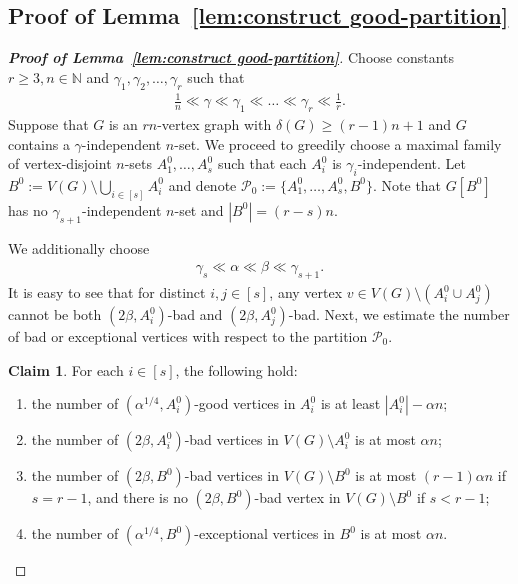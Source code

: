 \documentclass[11pt, a4paper]{article}
\theoremstyle{definition}
\newtheorem{claim}[theorem]{Claim}
\newcommand{\<}{\subseteq}
\begin{document}
\subsection{Proof of Lemma~\ref{lem:construct good-partition}}




\begin{proof}[{\bf Proof of Lemma~\ref{lem:construct good-partition}}]
Choose constants $r\geq 3,n\in \mathbb{N}$ and $\gamma_1,\gamma_2,\dots,\gamma_r$ such that 
\begin{align*}%
    \frac{1}{n}\ll \gamma \ll \gamma_1\ll \dots \ll \gamma_r\ll\frac{1}{r}.
\end{align*}
Suppose that $G$ is an $rn$-vertex graph with $\delta(G)\geq (r-1)n+1$ and $G$ contains a $\gamma$-independent $n$-set. We proceed to greedily choose a maximal family of vertex-disjoint $n$-sets $A_1^0, \dotsc, A_s^0$ such that each $A_i^0$ is $\gamma_i$-independent.
Let $B^0 := V(G) \setminus \bigcup_{i \in [s]} A_i^0$ and denote $\mathcal{P}_0:=\{A_1^0,\ldots,A_s^0,B^0\}$.
Note that $G[B^0]$ has no $\gamma_{s+1}$-independent $n$-set and $|B^0|=(r-s)n$.

We additionally choose 
\begin{align*}%
    \gamma_s\ll \alpha \ll\beta\ll \gamma_{s+1}.
\end{align*}
It is easy to see that for distinct $i,j\in [s]$, any vertex $v\in V(G)\setminus (A_i^0\cup A_j^0)$ cannot be both $(2\beta,A_i^0)$-bad and $(2\beta,A_j^0)$-bad. Next, we estimate the number of bad or exceptional vertices with respect to the partition $\mathcal{P}_0$. %
\begin{claim}\label{fact:bad vertices for Ai}
For each $i\in [s]$, the following hold:
\begin{enumerate}[label=(\arabic*)]
    \item\label{large-degree vtx} the number of $(\alpha^{1/4},A_i^0)$-good vertices in $A_i^0$ is at least $|A_i^0|-\alpha n$;
    \item\label{bad vtx2} the number of {$(2\beta,A_i^0)$}-bad vertices in $V(G)\setminus A_i^0$ is at most ${\alpha}n$;
    \item\label{bad vtx3} the number of {$(2\beta,B^0)$}-bad vertices in $V(G)\setminus B^0$ is at most $(r-1){\alpha} n$ if $s=r-1$, and there is no $({2\beta},B^0)$-bad vertex in $V(G)\setminus B^0$ if $s<r-1$;
    \item\label{bad vtx4} the number of $(\alpha^{1/4},B^0)$-exceptional vertices in $B^0$ is at most $\alpha n$.
\end{enumerate}
\end{claim}


\end{proof}
\end{document}
